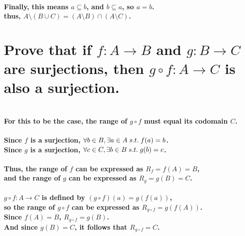 \documentclass{article}
\begin{document}
\paragraph{\large
Finally, this means \(a \subseteq b\), and \(b \subseteq a\), so \(a = b\).
\\ thus, \(A \setminus (B \cup C) = (A \setminus B) \cap (A \setminus C)\).}

\newpage

\section{Prove that if \(f: A \rightarrow B\) and \(g: B \rightarrow C\) are surjections, then \(g \circ f: A \rightarrow C\) is also a surjection.}

\paragraph{\large
\\ For this to be the case, the range of \(g \circ f\) must equal its codomain \(C\).}

\paragraph{\large
Since \(f\) is a surjection, \(\forall b \in B, \exists a \in A \thickspace s.t. \thickspace f(a) = b\).
\\ Since \(g\) is a surjection, \(\forall c \in C, \exists b \in B \thickspace s.t. \thickspace g(b) = c\).}

\paragraph{\large
Thus, the range of \(f\) can be expressed as \(R_f = f(A) = B\),
\\ and the range of \(g\) can be expressed as \(R_g = g(B) = C\).
}

\paragraph{\large
\(g \circ f: A \rightarrow C\) is defined by \((g \circ f)(a) = g(f(a))\),
\\\indent so the range of \(g \circ f\) can be expressed as \(R_{g \circ f} = g(f(A))\).
\\\indent Since \(f(A) = B\), \(R_{g \circ f} = g(B)\).
\\\indent And since \(g(B) = C\), it follows that \(R_{g \circ f} = C\).}
\end{document}
